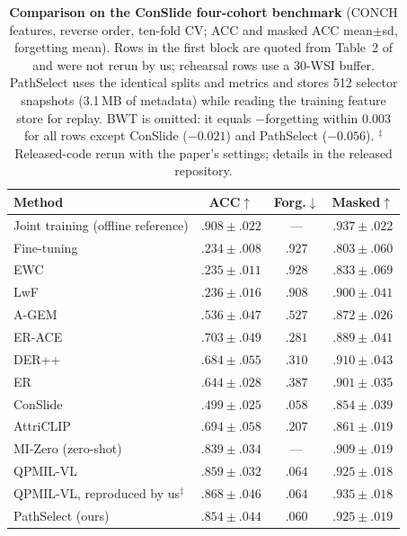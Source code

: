 \documentclass{article}
\begin{document}
\begin{table}[!t]
\centering\footnotesize\renewcommand{\arraystretch}{0.93}
\setlength{\tabcolsep}{3.5pt}
\caption{\textbf{Comparison on the ConSlide four-cohort benchmark} \cite{huang2023conslide} (CONCH features, reverse order, ten-fold CV; ACC and masked ACC mean$\pm$sd, forgetting mean). Rows in the first block are quoted from Table~2 of \cite{gou2025qpmil} and were not rerun by us; rehearsal rows use a 30-WSI buffer. PathSelect uses the identical splits and metrics and stores 512 selector snapshots (3.1\,MB of metadata) while reading the training feature store for replay. BWT is omitted: it equals $-$forgetting within $0.003$ for all rows except ConSlide ($-0.021$) and PathSelect ($-0.056$). $^\ddagger$Released-code rerun with the paper's settings; details in the released repository.}
\label{tab:sota}
\begin{tabular}{lccc}
\toprule
Method & ACC$\uparrow$ & Forg.$\downarrow$ & Masked$\uparrow$ \\
\midrule
Joint training (offline reference) & $.908{\pm}.022$ & --- & $.937{\pm}.022$ \\
Fine-tuning & $.234{\pm}.008$ & $.927$ & $.803{\pm}.060$ \\
EWC \cite{kirkpatrick2017ewc} & $.235{\pm}.011$ & $.928$ & $.833{\pm}.069$ \\
LwF \cite{li2017lwf} & $.236{\pm}.016$ & $.908$ & $.900{\pm}.041$ \\
A-GEM \cite{chaudhry2019agem} & $.536{\pm}.047$ & $.527$ & $.872{\pm}.026$ \\
ER-ACE \cite{caccia2022erace} & $.703{\pm}.049$ & $.281$ & $.889{\pm}.041$ \\
DER++ \cite{buzzega2020derpp} & $.684{\pm}.055$ & $.310$ & $.910{\pm}.043$ \\
ER \cite{chaudhry2019er} & $.644{\pm}.028$ & $.387$ & $.901{\pm}.035$ \\
ConSlide \cite{huang2023conslide} & $.499{\pm}.025$ & $.058$ & $.854{\pm}.039$ \\
AttriCLIP \cite{wang2023attriclip} & $.694{\pm}.058$ & $.207$ & $.861{\pm}.019$ \\
MI-Zero \cite{lu2023mizero} (zero-shot) & $.839{\pm}.034$ & --- & $.909{\pm}.019$ \\
QPMIL-VL \cite{gou2025qpmil} & $.859{\pm}.032$ & $.064$ & $.925{\pm}.018$ \\
\midrule
QPMIL-VL, reproduced by us$^\ddagger$ & $.868{\pm}.046$ & $.064$ & $.935{\pm}.018$ \\
\midrule
PathSelect (ours) & $.854{\pm}.044$ & $.060$ & $.925{\pm}.019$ \\
\bottomrule
\end{tabular}
\end{table}
\end{document}
